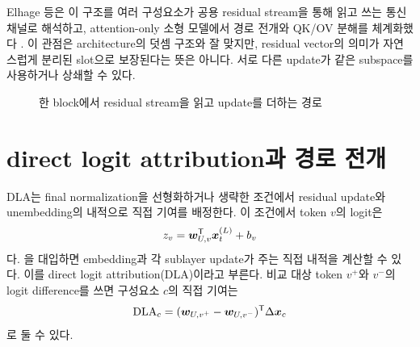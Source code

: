 Elhage 등은 이 구조를 여러 구성요소가 공용 residual stream을 통해 읽고 쓰는 통신 채널로 해석하고, attention-only 소형 모델에서 경로 전개와 QK/OV 분해를 체계화했다 \citep{elhage2021framework}.
이 관점은 architecture의 덧셈 구조와 잘 맞지만, residual vector의 의미가 자연스럽게 분리된 slot으로 보장된다는 뜻은 아니다.
서로 다른 update가 같은 subspace를 사용하거나 상쇄할 수 있다.

\begin{figure}[htbp]
\centering
{}
\caption{한 block에서 residual stream을 읽고 update를 더하는 경로}
\label{fig:residual-communication}
\end{figure}

\section{direct logit attribution과 경로 전개}

DLA는 final normalization을 선형화하거나 생략한 조건에서 residual update와 unembedding의 내적으로 직접 기여를 배정한다.
이 조건에서 token $v$의 logit은
\begin{equation}
  z_v=\bm{w}_{U,v}^{\mathsf T}\bm{x}^{(L)}_t+b_v
\end{equation}
다.
을 대입하면 embedding과 각 sublayer update가 주는 직접 내적을 계산할 수 있다.
이를 direct logit attribution(DLA)이라고 부른다.
비교 대상 token $v^+$와 $v^-$의 logit difference를 쓰면 구성요소 $c$의 직접 기여는
\begin{equation}
  \operatorname{DLA}_c=
  (\bm{w}_{U,v^+}-\bm{w}_{U,v^-})^{\mathsf T}\Delta\bm{x}_c
  \label{eq:dla}
\end{equation}
로 둘 수 있다.

